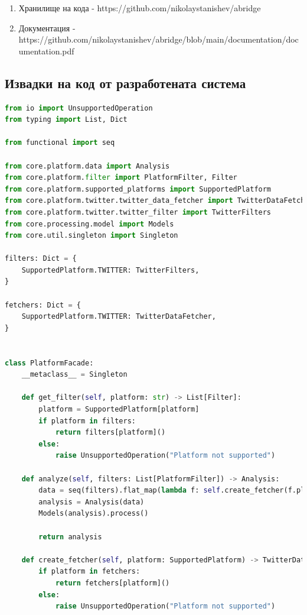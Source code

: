 \documentclass{article}
\begin{document}
\begin{enumerate}
\item Хранилище на кода - https://github.com/nikolaystanishev/abridge
\item Документация - \\
https://github.com/nikolaystanishev/abridge/blob/main/documentation/documentation.pdf
\end{enumerate}

\subsection{Извадки на код от разработената система}

\begin{lstlisting}[language=Python, caption=core.platform.platform\_facade]
from io import UnsupportedOperation
from typing import List, Dict

from functional import seq

from core.platform.data import Analysis
from core.platform.filter import PlatformFilter, Filter
from core.platform.supported_platforms import SupportedPlatform
from core.platform.twitter.twitter_data_fetcher import TwitterDataFetcher
from core.platform.twitter.twitter_filter import TwitterFilters
from core.processing.model import Models
from core.util.singleton import Singleton

filters: Dict = {
    SupportedPlatform.TWITTER: TwitterFilters,
}

fetchers: Dict = {
    SupportedPlatform.TWITTER: TwitterDataFetcher,
}


class PlatformFacade:
    __metaclass__ = Singleton

    def get_filter(self, platform: str) -> List[Filter]:
        platform = SupportedPlatform[platform]
        if platform in filters:
            return filters[platform]()
        else:
            raise UnsupportedOperation("Platform not supported")

    def analyze(self, filters: List[PlatformFilter]) -> Analysis:
        data = seq(filters).flat_map(lambda f: self.create_fetcher(f.platform).fetch(f.filters)).distinct().to_list()
        analysis = Analysis(data)
        Models(analysis).process()

        return analysis

    def create_fetcher(self, platform: SupportedPlatform) -> TwitterDataFetcher:
        if platform in fetchers:
            return fetchers[platform]()
        else:
            raise UnsupportedOperation("Platform not supported")
\end{lstlisting}
\end{document}
